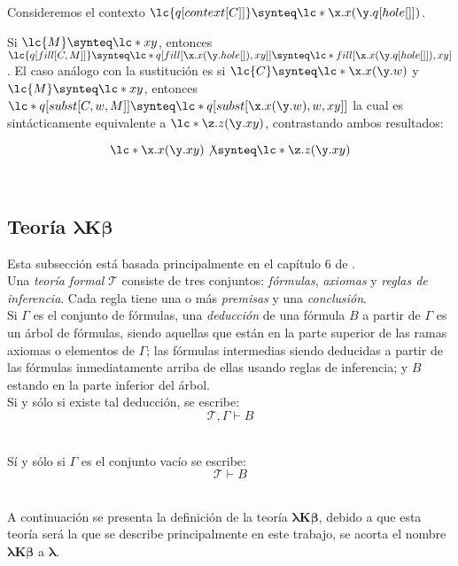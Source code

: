 \begin{ejemplo} Consideremos el contexto \(\lc{q[context[C]]} \synteq
  \lc*{\x.x(\y.q[hole[]])}\).

  Si \(\lc{M} \synteq \lc*{x y}\), entonces \(\lc{q[fill[C,M]]} \synteq
  \lc*{q[fill[\x.x(\y.hole[]), x y]]} \synteq \lc*{fill[\x.x(\y.q[hole[]]), x
    y]}\). El caso análogo con la sustitución es si \(\lc{C} \synteq
  \lc*{\x.x(\y.w)}\) y \(\lc{M} \synteq \lc*{x y}\), entonces
  \(\lc*{q[subst[C,w,M]]} \synteq \lc*{q[subst[\x.x(\y.w),w,x y]]}\) la cual es
  sintácticamente equivalente a \(\lc*{\z.z(\y.x y)}\), contrastando ambos
  resultados:

  \[\lc*{\x.x(\y.x y)} \not\synteq \lc*{\z.z(\y.x y)}\]
\end{ejemplo} \

\subsection{Teoría \texorpdfstring{\(\boldsymbol{\lambda K \beta}\)}{\lambda K
    \beta}}

Esta subsección está basada principalmente en el capítulo 6 de
\cite{HindleySeldin:LambdaCalculusAndCombinators}. \\

Una \emph{teoría formal} \(\mathcal{T}\) consiste de tres conjuntos:
\emph{fórmulas}, \emph{axiomas} y \emph{reglas de inferencia}. Cada regla
tiene una o más \emph{premisas} y una \emph{conclusión}. \\

Si \(\Gamma\) es el conjunto de fórmulas, una \emph{deducción} de una fórmula
\(B\) a partir de \(\Gamma\) es un árbol de fórmulas, siendo aquellas que están
en la parte superior de las ramas axiomas o elementos de \(\Gamma\); las
fórmulas intermedias siendo deducidas a partir de las fórmulas inmediatamente
arriba de ellas usando reglas de inferencia; y \(B\) estando en la parte
inferior del árbol. \\

Si y sólo si existe tal deducción, se escribe: \\

\[\mathcal{T},\Gamma \vdash B\] \

Sí y sólo si \(\Gamma\) es el conjunto vacío se escribe: \\

\[\mathcal{T} \vdash B\] \

A continuación se presenta la definición de la teoría \(\boldsymbol{\lambda K
  \beta}\), debido a que esta teoría será la que se describe principalmente en
este trabajo, se acorta el nombre \(\boldsymbol{\lambda K \beta}\) a
\(\boldsymbol{\lambda}\). \\

